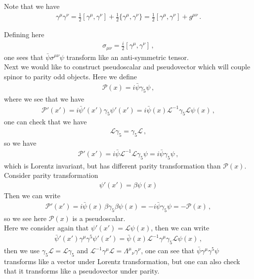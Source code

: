 \documentclass[11pt, onesided]{book}
\theoremstyle{break}
\theoremstyle{break}
\begin{document}
Note that we have
\begin{align*}
\gamma^\mu \gamma^\nu = \frac{1}{2}[\gamma^\mu, \gamma^\nu] + \frac{1}{2}\{\gamma^\mu , \gamma^\nu\} = \frac{1}{2}[\gamma^\mu, \gamma^\nu] + g^{\mu\nu}\,.
\end{align*}

Defining here
\begin{align*}
\sigma_{\mu\nu} = \frac{i}{2}[\gamma^\mu , \gamma^\nu]\,,
\end{align*}
one sees that $\bar{\psi} \sigma^{\mu\nu}\psi$ transform like an anti-symmetric tensor. \\


Next we would like to construct pseudoscalar and pseudovector which will couple spinor to parity odd objects. Here we define
\begin{align*}
\mathcal{P}(x) = i \bar{\psi} \gamma_5 \psi \,,
\end{align*}
where we see that we have
\begin{align*}
\mathcal{P}'(x') = i\bar{\psi}'(x') \gamma_5 \psi'(x') = i\bar{\psi}(x) \mathcal{L}^{-1} \gamma_5 \mathcal{L}\psi(x)\,,
\end{align*}
one can check that we have
\begin{align*}
\mathcal{L}\gamma_5 = \gamma_5 \mathcal{L}\,,
\end{align*}
so we have
\begin{align*}
\mathcal{P}'(x') = i \bar{\psi} \mathcal{L}^{-1}\mathcal{L}\gamma_5 \psi =i \bar{\psi} \gamma_5 \psi\,,
\end{align*}
which is Lorentz invariant, but has different parity transformation than $\mathcal{P}(x)$. Consider parity transformation
\begin{align*}
\psi'(x') = \beta \psi(x)
\end{align*}
Then we can write
\begin{align*}
\mathcal{P}'(x') = i\bar{\psi}(x) \, \beta \gamma_5 \beta \psi(x) = -i\bar{\psi}\gamma_5 \psi = -\mathcal{P}(x)\,,
\end{align*}
so we see here $\mathcal{P}(x)$ is a pseudoscalar. \\


Here we consider again that $\psi'(x') = \mathcal{L}\psi(x)$, then we can write
\begin{align*}
\bar{\psi}'(x')\gamma^\mu \gamma^5 \psi'(x') = \bar{\psi}(x) \mathcal{L}^{-1} \gamma^\mu \gamma_5 \mathcal{L}\psi(x)\,,
\end{align*}
then we use $\gamma_5 \mathcal{L} = \mathcal{L}\gamma_5$ and $\mathcal{L}^{-1} \gamma^\mu \mathcal{L} = \Lambda^{\mu}{}_{\nu}\gamma^\nu$, one can see that
$\bar{\psi}\gamma^\mu \gamma^5\psi$ transforms like a vector under Lorentz transformation, but one can also check that it transforms like a pseudovector under parity. \\
\end{document}
